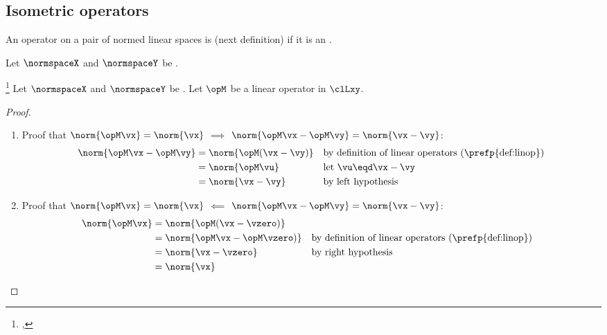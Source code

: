 \subsection{Isometric operators}
An operator on a pair of normed linear spaces is  (next definition) 
if it is an . %
\begin{definition}
\label{def:op_isometric}
Let $\normspaceX$ and $\normspaceY$ be  .
\end{definition}

\begin{theorem}
\footnote{
  ,
  }
\label{thm:op_normiso}
Let $\normspaceX$ and $\normspaceY$ be .
Let $\opM$ be a linear operator in $\clLxy$.
\end{theorem}
\begin{proof}
\begin{enumerate}
  \item Proof that $\norm{\opM\vx}=\norm{\vx}$ $\implies$ $\norm{\opM\vx-\opM\vy}=\norm{\vx-\vy}$:
    \begin{align*}
      \norm{\opM\vx-\opM\vy}
        &= \norm{\opM(\vx-\vy)}
        && \text{by definition of linear operators (\prefp{def:linop})}
      \\&= \norm{\opM\vu}
        && \text{let $\vu\eqd\vx-\vy$}
      \\&=\norm{\vx-\vy}
        && \text{by left hypothesis}
    \end{align*}

  \item Proof that $\norm{\opM\vx}=\norm{\vx}$ $\impliedby$ $\norm{\opM\vx-\opM\vy}=\norm{\vx-\vy}$:
    \begin{align*}
      \norm{\opM\vx}
        &= \norm{\opM(\vx-\vzero)}
      \\&= \norm{\opM\vx-\opM\vzero)}
        && \text{by definition of linear operators (\prefp{def:linop})}
      \\&= \norm{\vx-\vzero}
        && \text{by right hypothesis}
      \\&=\norm{\vx}
    \end{align*}

\end{enumerate}
\end{proof}

